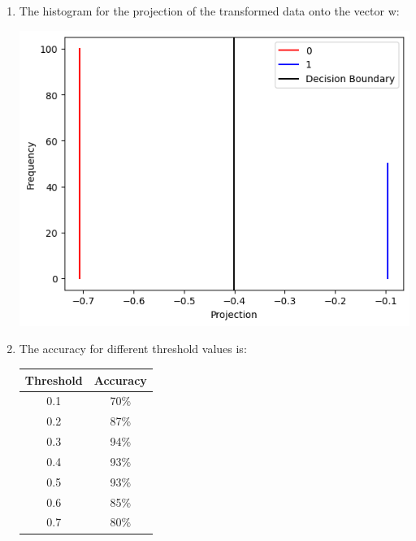 \documentclass[12pt]{article}
\begin{document}
\begin{enumerate}
    \bigskip
    \item The histogram for the projection of the transformed data onto the vector w:
    \begin{center}
        \includegraphics{img/transform.png}
    \end{center}

    \item The accuracy for different threshold values is:
    \begin{center}
        \begin{tabular}{|c|c|}
            \hline
            Threshold & Accuracy \\
            \hline
            0.1 & 70\% \\
            0.2 & 87\% \\
            0.3 & 94\% \\
            0.4 & 93\% \\
            0.5 & 93\% \\
            0.6 & 85\% \\
            0.7 & 80\% \\
            \hline
        \end{tabular}
    \end{center}
\end{enumerate}
\end{document}
